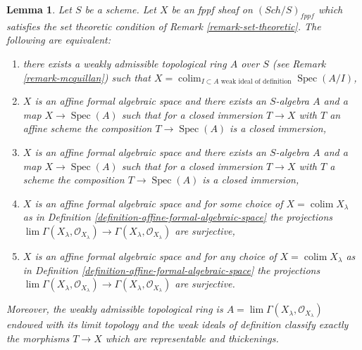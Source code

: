 \documentclass{amsart}
\theoremstyle{plain}
\newtheorem{lemma}[subsection]{Lemma}
\theoremstyle{definition}
\theoremstyle{remark}
\numberwithin{equation}{subsection}
\def\lim{\mathop{\mathrm{lim}}\nolimits}
\def\colim{\mathop{\mathrm{colim}}\nolimits}
\def\Spec{\mathop{\mathrm{Spec}}}
\def\Sch{\mathit{Sch}}
\begin{document}
\begin{lemma}
\label{lemma-mcquillan-affine-formal-algebraic-space}
Let $S$ be a scheme. Let $X$ be an fppf sheaf on $(\Sch/S)_{fppf}$
which satisfies the set theoretic condition of
Remark \ref{remark-set-theoretic}.
The following are equivalent:
\begin{enumerate}
\item there exists a weakly admissible topological ring $A$ over $S$
(see Remark \ref{remark-mcquillan}) such that
$X = \colim_{I \subset A\text{ weak ideal of definition}} \Spec(A/I)$,
\item $X$ is an affine formal algebraic space and
there exists an $S$-algebra $A$ and a map $X \to \Spec(A)$
such that for a closed immersion $T \to X$ with $T$ an affine scheme
the composition $T \to \Spec(A)$ is a closed immersion,
\item $X$ is an affine formal algebraic space and
there exists an $S$-algebra $A$ and a map $X \to \Spec(A)$
such that for a closed immersion $T \to X$ with $T$ a scheme
the composition $T \to \Spec(A)$ is a closed immersion,
\item $X$ is an affine formal algebraic space and
for some choice of $X = \colim X_\lambda$ as in
Definition \ref{definition-affine-formal-algebraic-space}
the projections $\lim \Gamma(X_\lambda, \mathcal{O}_{X_\lambda})
\to \Gamma(X_\lambda, \mathcal{O}_{X_\lambda})$ are surjective,
\item $X$ is an affine formal algebraic space and for any choice
of $X = \colim X_\lambda$ as in
Definition \ref{definition-affine-formal-algebraic-space}
the projections $\lim \Gamma(X_\lambda, \mathcal{O}_{X_\lambda})
\to \Gamma(X_\lambda, \mathcal{O}_{X_\lambda})$ are surjective.
\end{enumerate}
Moreover, the weakly admissible topological ring is
$A = \lim \Gamma(X_\lambda, \mathcal{O}_{X_\lambda})$
endowed with its limit topology and the weak ideals of definition
classify exactly the morphisms $T \to X$ which are representable
and thickenings.
\end{lemma}
\end{document}
